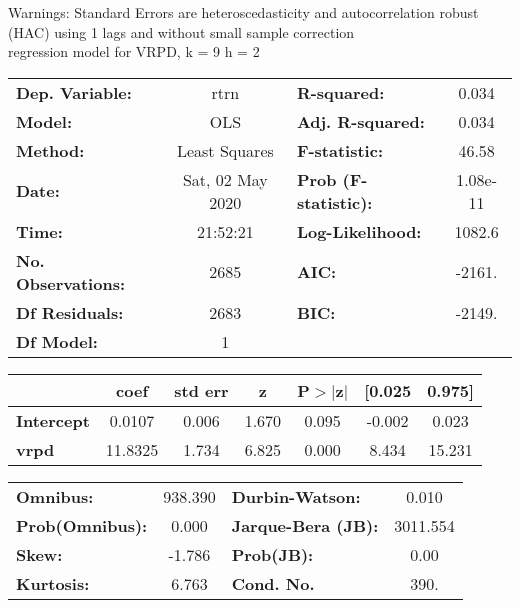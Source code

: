 Warnings: \newline
 [1] Standard Errors are heteroscedasticity and autocorrelation robust (HAC) using 1 lags and without small sample correction\\ 

regression model for VRPD, k = 9 h = 2\begin{center}
\begin{tabular}{lclc}
\toprule
\textbf{Dep. Variable:}    &       rtrn       & \textbf{  R-squared:         } &     0.034   \\
\textbf{Model:}            &       OLS        & \textbf{  Adj. R-squared:    } &     0.034   \\
\textbf{Method:}           &  Least Squares   & \textbf{  F-statistic:       } &     46.58   \\
\textbf{Date:}             & Sat, 02 May 2020 & \textbf{  Prob (F-statistic):} &  1.08e-11   \\
\textbf{Time:}             &     21:52:21     & \textbf{  Log-Likelihood:    } &    1082.6   \\
\textbf{No. Observations:} &        2685      & \textbf{  AIC:               } &    -2161.   \\
\textbf{Df Residuals:}     &        2683      & \textbf{  BIC:               } &    -2149.   \\
\textbf{Df Model:}         &           1      & \textbf{                     } &             \\
\bottomrule
\end{tabular}
\begin{tabular}{lcccccc}
                   & \textbf{coef} & \textbf{std err} & \textbf{z} & \textbf{P$> |$z$|$} & \textbf{[0.025} & \textbf{0.975]}  \\
\midrule
\textbf{Intercept} &       0.0107  &        0.006     &     1.670  &         0.095        &       -0.002    &        0.023     \\
\textbf{vrpd}      &      11.8325  &        1.734     &     6.825  &         0.000        &        8.434    &       15.231     \\
\bottomrule
\end{tabular}
\begin{tabular}{lclc}
\textbf{Omnibus:}       & 938.390 & \textbf{  Durbin-Watson:     } &    0.010  \\
\textbf{Prob(Omnibus):} &   0.000 & \textbf{  Jarque-Bera (JB):  } & 3011.554  \\
\textbf{Skew:}          &  -1.786 & \textbf{  Prob(JB):          } &     0.00  \\
\textbf{Kurtosis:}      &   6.763 & \textbf{  Cond. No.          } &     390.  \\
\bottomrule
\end{tabular}
\end{center}

